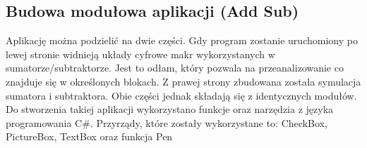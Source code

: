 \documentclass[12pt, a4paper, onside, polish]{article}				%
\begin{document}
\subsection{Budowa modułowa aplikacji (Add Sub)}
\hspace{\parindent}
Aplikację można podzielić na dwie części. Gdy program zostanie uruchomiony po lewej stronie widnieją układy cyfrowe makr wykorzystanych w sumatorze/subtraktorze. Jest to odłam, który pozwala na przeanalizowanie co znajduje się w określonych blokach. Z prawej strony zbudowana została symulacja sumatora i subtraktora. Obie części jednak składają się z identycznych modułów. Do stworzenia takiej aplikacji wykorzystano funkcje oraz narzędzia z języka programowania C\#. Przyrządy, które zostały wykorzystane to: CheckBox, PictureBox, TextBox oraz funkcja Pen  \newline\newline
\end{document}

